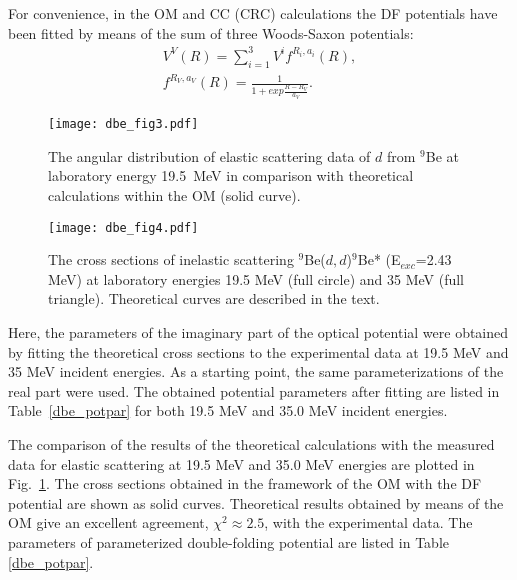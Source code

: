 \documentclass[
12pt, %
oneside, %
english, %
doublespacing, %
doublespacing, %
toctotoc, %
parskip, %
headsepline, %
]{MastersDoctoralThesis} %
\begin{document}
For convenience, in the OM and CC (CRC) calculations the DF potentials have been fitted by means of the sum of three Woods-Saxon potentials:
\begin{eqnarray}
V^V(R) =  \sum_{i=1}^{3} V^i f^{R_i, a_i}(R), \\
 f^{R_V,a_V}(R)=\frac{1}{1+exp{\frac{R-R_V}{a_V}}}.
\end{eqnarray}
\begin{figure}[bp]
\centering
\texttt{[image: dbe\_fig3.pdf]}
\decoRule
\caption{ \label{dbe_fig3}  The angular distribution of elastic scattering data of $d$ from ${}^9$Be at laboratory energy 19.5~MeV in comparison with theoretical calculations within the OM (solid curve). }
\end{figure}
\begin{figure}[tp]
\centering
\texttt{[image: dbe\_fig4.pdf]}
\decoRule
\caption{\label{dbe_fig4}  The cross sections of inelastic scattering ${}^9$Be($d,d$)$^9$Be* (E$_{exc}$=2.43 MeV) at laboratory energies 19.5 MeV (full circle) and 35 MeV (full triangle). Theoretical curves are described in the text.}
\end{figure} 
Here, the parameters of the imaginary part of the optical potential were obtained by fitting the theoretical cross sections to the experimental data at 19.5 MeV and 35 MeV incident energies. As a starting point, the same parameterizations of the real part were used. The obtained potential parameters after fitting are listed in Table~\ref{dbe_potpar} for both 19.5 MeV and 35.0 MeV incident energies.

The comparison of the results of the theoretical calculations with  the measured data for elastic scattering at 19.5 MeV and 35.0 MeV energies are plotted in Fig.~\ref{dbe_fig3}. 
The cross sections obtained in the framework of the OM with the DF potential are shown as solid curves. 
Theoretical results obtained by means of the OM give an excellent agreement, $\chi^2\approx2.5$, with the experimental data. The  parameters of  parameterized double-folding potential are listed in Table \ref{dbe_potpar}. 
\end{document}
